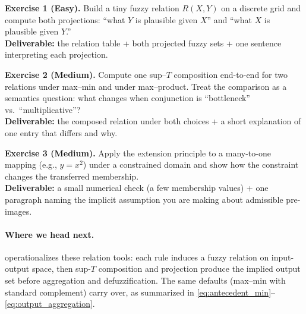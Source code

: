 \begin{tcolorbox}[summarybox, title={Exercises}]
\textbf{Exercise 1 (Easy).} Build a tiny fuzzy relation \(R(X,Y)\) on a discrete grid and compute both projections: ``what \(Y\) is plausible given \(X\)'' and ``what \(X\) is plausible given \(Y\).'' \\
\textbf{Deliverable:} the relation table + both projected fuzzy sets + one sentence interpreting each projection.

\smallskip
\textbf{Exercise 2 (Medium).} Compute one sup--\(T\) composition end-to-end for two relations under max--min and under max--product. Treat the comparison as a semantics question: what changes when conjunction is ``bottleneck'' vs.\ ``multiplicative''? \\
\textbf{Deliverable:} the composed relation under both choices + a short explanation of one entry that differs and why.

\smallskip
\textbf{Exercise 3 (Medium).} Apply the extension principle to a many-to-one mapping (e.g., \(y=x^2\)) under a constrained domain and show how the constraint changes the transferred membership. \\
\textbf{Deliverable:} a small numerical check (a few membership values) + one paragraph naming the implicit assumption you are making about admissible pre-images.
\end{tcolorbox}

\paragraph{Where we head next.}  operationalizes these relation tools: each rule induces a fuzzy relation on input-output space, then sup-$T$ composition and projection produce the implied output set before aggregation and defuzzification. The same defaults (max--min with standard complement) carry over, as summarized in \eqref{eq:antecedent_min}--\eqref{eq:output_aggregation}.

\nocite{Zadeh1975, BandlerKohout1980, KlirYuan1995, Dubois1988, Klement2000}

